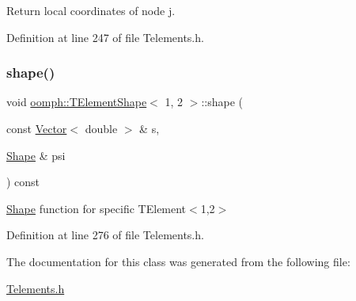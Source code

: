 Return local coordinates of node j. 



Definition at line 247 of file Telements.\+h.

\mbox{\label{classoomph_1_1TElementShape_3_011_00_012_01_4_a8eab8c5435e8ac796423de96e3b3f688}} 
\subsubsection{\texorpdfstring{shape()}{shape()}}
{\footnotesize\ttfamily void \hyperlink{classoomph_1_1TElementShape}{oomph\+::\+T\+Element\+Shape}$<$ 1, 2 $>$\+::shape (\begin{DoxyParamCaption}\item[{const \hyperlink{classoomph_1_1Vector}{Vector}$<$ double $>$ \&}]{s,  }\item[{\hyperlink{classoomph_1_1Shape}{Shape} \&}]{psi }\end{DoxyParamCaption}) const\hspace{0.3cm}{\ttfamily [inline]}}



\hyperlink{classoomph_1_1Shape}{Shape} function for specific T\+Element$<$1,2$>$ 



Definition at line 276 of file Telements.\+h.



The documentation for this class was generated from the following file\+:\begin{DoxyCompactItemize}
\item 
\hyperlink{Telements_8h}{Telements.\+h}\end{DoxyCompactItemize}
